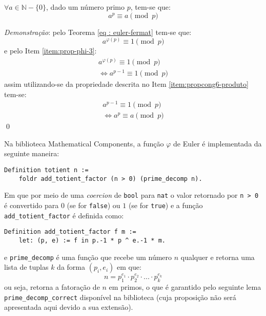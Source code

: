 \begin{teorema}
\label{eq : pequeno-fermat}
$\forall a \in \mathbb{N} - \{0\}$, dado um número primo $p$, tem-se que:
    \begin{equation*}
        a^p \equiv a \pmod{p}
    \end{equation*}
\end{teorema}

\noindent
\textit{Demonstração}: pelo Teorema \ref{eq : euler-fermat} tem-se que:
\begin{equation*}
    a^{\varphi(p)} \equiv 1 \pmod{p}
\end{equation*}
e pelo Item \ref{item:prop-phi-3}:
\begin{align*}
    a^{\varphi(p)} \equiv 1 \pmod{p}
    \\
    \Longleftrightarrow a^{p-1} \equiv 1 \pmod{p}
\end{align*}
assim utilizando-se da propriedade descrita no Item \ref{item:propcong6-produto} tem-se:
\begin{align*}
    a^{p-1} \equiv 1 \pmod{p}
    \\
    \Longleftrightarrow a^{p} \equiv a \pmod{p}
\end{align*} \qed

Na biblioteca Mathematical Components, a função $\varphi$ de Euler é implementada da seguinte maneira:
\begin{lstlisting}[language=coq,frame=single,tabsize=1]
Definition totient n := 
    foldr add_totient_factor (n > 0) (prime_decomp n).
\end{lstlisting}
Em que por meio de uma \textit{coercion} de \lstinline[language = coq]{bool} para \lstinline[language = coq]{nat} o valor retornado por \lstinline[language = coq]{n > 0} é convertido para $0$ (se for \lstinline[language = coq]{false}) ou $1$ (se for \lstinline[language = coq]{true}) e a função \lstinline[language = coq]{add_totient_factor} é definida como:
\begin{lstlisting}[language=coq,frame=single,tabsize=1]
Definition add_totient_factor f m := 
    let: (p, e) := f in p.-1 * p ^ e.-1 * m.
\end{lstlisting}
e \lstinline[language = coq]{prime_decomp} é uma função que recebe um número $n$ qualquer e retorna uma lista de tuplas $k$ da forma $(p_i, e_i)$ em que:
    \begin{equation*}
        n = p_1^{e_1} \cdot p_2^{e_2} \cdot ... \cdot p_k^{e_k}
    \end{equation*}
ou seja, retorna a fatoração de $n$ em primos, o que é garantido pelo seguinte lema \lstinline[language = coq]{prime_decomp_correct} disponível na biblioteca (cuja proposição não será apresentada aqui devido a sua extensão).

